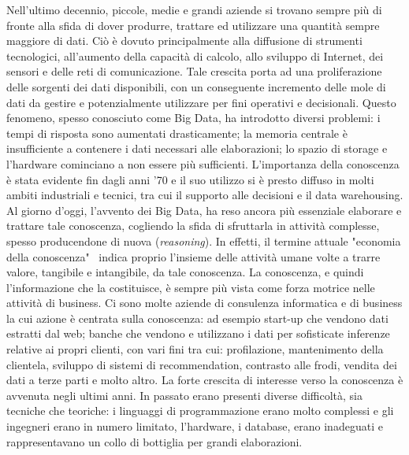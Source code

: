 Nell'ultimo decennio, piccole, medie e grandi aziende si trovano sempre più di fronte alla sfida di dover produrre, trattare ed utilizzare una quantità sempre maggiore di dati. Ciò è dovuto principalmente alla diffusione di strumenti tecnologici, all'aumento della capacità di calcolo, allo sviluppo di Internet, dei sensori e delle reti di comunicazione. \newline
Tale crescita porta ad una proliferazione delle sorgenti dei dati disponibili, con un conseguente incremento delle mole di dati da gestire e potenzialmente utilizzare per fini operativi e decisionali. Questo fenomeno, spesso conosciuto come Big Data, ha introdotto diversi problemi: i tempi di risposta sono aumentati drasticamente; la memoria centrale è insufficiente a contenere i dati necessari alle elaborazioni; lo spazio di storage e l'hardware cominciano a non essere più sufficienti. \newline
L'importanza della conoscenza è stata evidente fin dagli anni '70 e il suo utilizzo si è presto diffuso in molti ambiti industriali e tecnici, tra cui il supporto alle decisioni e il data warehousing. \newline
Al giorno d'oggi, l'avvento dei Big Data, ha reso ancora più essenziale elaborare e trattare tale conoscenza, cogliendo la sfida di sfruttarla in attività complesse, spesso producendone di nuova (\emph{reasoning}). \newline
In effetti, il termine attuale "economia della conoscenza"~\cite{WIKI:CONOSCENZA} indica proprio l'insieme delle attività umane volte a trarre valore, tangibile e intangibile, da tale conoscenza. La conoscenza, e quindi l'informazione che la costituisce, è sempre più vista come forza motrice nelle attività di business. Ci sono molte aziende di consulenza informatica e di business la cui azione è centrata sulla conoscenza: ad esempio start-up che vendono dati estratti dal web; banche che vendono e utilizzano i dati per sofisticate inferenze relative ai propri clienti, con vari fini tra cui: profilazione, mantenimento della clientela, sviluppo di sistemi di recommendation, contrasto alle frodi, vendita dei dati a terze parti e molto altro. \newline
La forte crescita di interesse verso la conoscenza è avvenuta negli ultimi anni. In passato erano presenti diverse difficoltà, sia tecniche che teoriche: i linguaggi di programmazione erano molto complessi e gli ingegneri erano in numero limitato, l'hardware, i database, erano inadeguati e rappresentavano un collo di bottiglia per grandi elaborazioni. \newline
